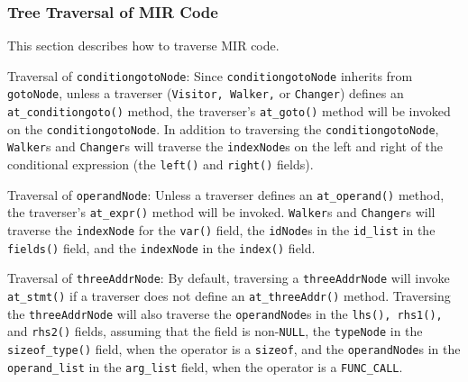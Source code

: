 \subsubsection{Tree Traversal of MIR Code}
\label{migrate:tree}

This section describes how to traverse MIR code.  

Traversal of \texttt{conditiongotoNode}:  Since \texttt{conditiongotoNode}
inherits from \texttt{gotoNode}, unless a traverser (\texttt{Visitor,
Walker,} or \texttt{Changer}) defines an \texttt{at\_conditiongoto()} method,
the traverser's \texttt{at\_goto()} method will be invoked on the
\texttt{conditiongotoNode}.  In addition to traversing the
\texttt{conditiongoto\-Node}, \texttt{Walker}s and \texttt{Changer}s will
traverse the \texttt{indexNode}s on the left and right of the conditional
expression (the \texttt{left()} and \texttt{right()} fields).

Traversal of \texttt{operandNode}:  Unless a traverser defines an
\texttt{at\_operand()} method, the traverser's \texttt{at\_expr()} method
will be invoked.  \texttt{Walker}s and \texttt{Changer}s will traverse the
\texttt{indexNode} for the \texttt{var()} field, the \texttt{idNode}s in the
\texttt{id\_list} in the \texttt{fields()} field, and the \texttt{indexNode}
in the \texttt{index()} field.

Traversal of \texttt{threeAddrNode}:  By default, traversing a
\texttt{threeAddrNode} will invoke \texttt{at\_stmt()} if a traverser does
not define an \texttt{at\_threeAddr()} method.  Traversing the
\texttt{threeAddrNode} will also traverse the \texttt{operandNode}s in the
\texttt{lhs(), rhs1(),} and \texttt{rhs2()} fields, assuming that the field
is non-\texttt{NULL}, the \texttt{typeNode} in the \texttt{sizeof\_type()}
field, when the operator is a \texttt{sizeof}, and the \texttt{operandNode}s
in the \texttt{operand\_list} in the \texttt{arg\_list} field, when the
operator is a \texttt{FUNC\_CALL}.
